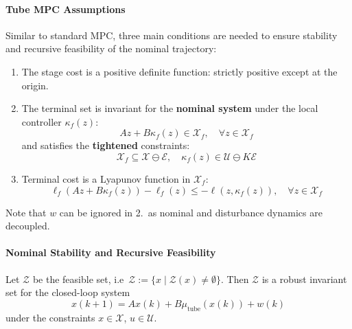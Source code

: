 \paragraph{Tube MPC Assumptions}
Similar to standard MPC, three main conditions are needed to ensure stability and recursive feasibility of the nominal trajectory:
\newpar{}
\begin{enumerate}
    \item The stage cost is a positive definite function: strictly positive except at the origin.
    \item The terminal set is invariant for the \textbf{nominal system} under the local controller $\kappa_f(z)$:
          \begin{equation*}
              A z + B \kappa_f(z) \in \mathcal{X}_f, \quad \forall z \in \mathcal{X}_f
          \end{equation*}
          and satisfies the \textbf{tightened} constraints:
          \begin{equation*}
              \mathcal{X}_f \subseteq \mathcal{X} \ominus \mathcal{E}, \quad \kappa_f(z) \in \mathcal{U} \ominus K \mathcal{E}
          \end{equation*}
    \item Terminal cost is a Lyapunov function in $\mathcal{X}_f$:
          \begin{equation*}
              \ell_f(Az + B\kappa_f(z)) - \ell_f(z) \leq -\ell(z, \kappa_f(z)), \quad \forall z \in \mathcal{X}_f
          \end{equation*}
\end{enumerate}
Note that $w$ can be ignored in 2.\ as nominal and disturbance dynamics are decoupled.

\paragraph{Nominal Stability and Recursive Feasibility}


Let $\mathcal{Z}$ be the feasible set, i.e\ $\mathcal{Z} := \{x \mid \mathcal{Z}(x) \neq \emptyset\}$. Then $\mathcal{Z}$ is a robust invariant set for the closed-loop system
\begin{equation*}
    x(k + 1) = A x(k) + B \mu_{\text{tube}}(x(k)) + w(k)
\end{equation*}
under the constraints $x \in \mathcal{X}$, $u \in \mathcal{U}$.
\newpar{}

